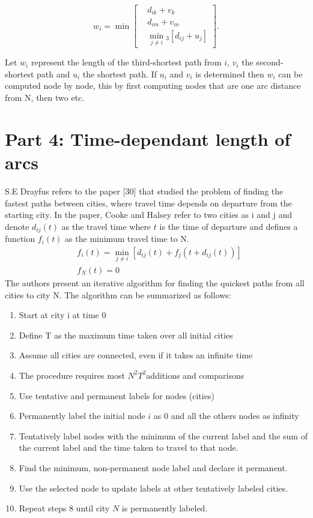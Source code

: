 \documentclass{article}
\begin{document}
\begin{equation}
    w_i = \min \left[
    \begin{aligned}
        & d_{ik} + v_k \\
        & d_{im} + v_m \\
        & \min_{j \neq i} \!_3 [d_{ij} + u_j]
    \end{aligned}
    \right].
\end{equation}

\noindent Let $w_i$ represent the length of the third-shortest path from $i$,
$v_i$ the second-shortest path and $u_i$ the shortest path. If $u_i$ 
and $v_i$ is determined then $w_i$ can be computed node by node, this 
by first computing nodes that are one arc distance from N, then two etc. 

\newpage
\section{Part 4: Time-dependant length of arcs}
S.E Drayfus refers to the paper [30] that studied the problem of finding 
the fastest paths between cities, where travel time depends on departure 
from the starting city. In the paper, Cooke and Halsey refer to two cities
as i and j and denote $d_{ij}(t)$ as the travel time where $t$ is the time of 
departure and defines a function $f_i(t)$ as the minimum travel time to N. 
\begin{equation}
    \begin{aligned}
        & f_i(t) = \min_{j \neq i}[d_{ij}(t)+f_j(t+d_{ij}(t))] \\
        & f_N(t) = 0
    \end{aligned}
\end{equation}
The authors present an iterative algorithm for finding the quickest 
paths from all cities to city N. The algorithm can be summarized as follows:
\begin{enumerate}
    \item Start at city i at time 0 
    \item Define T as the maximum time taken over all initial cities 
    \item Assume all cities are connected, even if it takes an infinite time
    \item The procedure requires most $N^{2}T^{2}$additions and comparisons 
    \item Use tentative and permanent labels for nodes (cities) 
    \item Permanently label the initial node $i$ as 0 and all the others nodes as infinity
    \item Tentatively label nodes with the minimum of the current label and the sum of the current label and the time taken to travel to that node.
    \item Find the minimum, non-permanent node label and declare it permanent.
    \item Use the selected node to update labels at other tentatively labeled cities.
    \item Repeat steps 8 until city $N$ is permanently labeled.
\end{enumerate}
\end{document}
